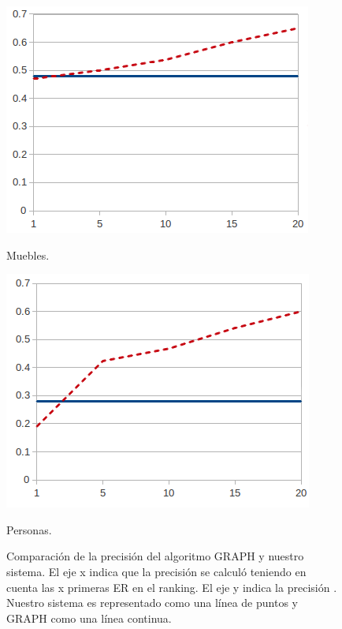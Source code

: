 \begin{table}[H]
\begin{figure}[H]
\begin{minipage}{0.50\linewidth}
\centering
\includegraphics[width=\textwidth]{images/furniturePrec.png}
\caption{Muebles.}
\end{minipage}
\begin{minipage}{0.50\linewidth}
\centering
\includegraphics[width=\textwidth]{images/precP.png}
\caption{Personas.}
\end{minipage}
\caption{Comparaci\'on de la precisi\'on  del algoritmo GRAPH y nuestro sistema. El eje x indica que la precisi\'on se calcul\'o teniendo en cuenta las x primeras ER en el ranking. El eje y indica la precisi\'on . Nuestro sistema es representado como una l\'inea de puntos y GRAPH como una l\'inea continua.\label{graficoPresicion}}
\end{figure}


\end{table}
